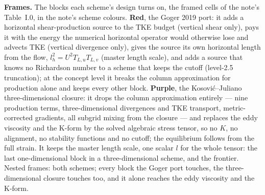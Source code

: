 \documentclass[10pt]{article}
\begin{document}
\begin{center}
\end{center}


\vspace{0.6ex}
{\footnotesize\textbf{Frames.} The blocks each scheme's design turns on, the framed cells of the note's Table~I.0,
in the note's scheme colours. \textcolor{cGXIX}{\textbf{Red}}, the Goger 2019 port: it adds a horizontal
shear-production source to the TKE budget (vertical shear only), pays it with the energy the numerical
horizontal operator would otherwise lose and advects TKE (vertical divergence only), gives the source its own
horizontal length from the flow, $l_h^2 = U^2 T_{L,u} T_{L,v}$ (master length scale), and adds a source that knows no
Richardson number to a scheme that keeps the cutoff (level-2.5 truncation); at the concept level it breaks the
column approximation for production alone and keeps every other block. \textcolor{cFULL}{\textbf{Purple}}, the
Kosovi\'c--Juliano three-dimensional closure: it drops the column approximation entirely --- nine production
terms, three-dimensional divergences and TKE transport, metric-corrected gradients, all subgrid mixing from the
closure --- and replaces the eddy viscosity and the K-form by the solved algebraic stress tensor, so no $K$, no
alignment, no stability functions and no cutoff; the equilibrium follows from the full strain. It keeps the master
length scale, one scalar $l$ for the whole tensor: the last one-dimensional block in a three-dimensional scheme, and
the frontier. Nested frames: both schemes; every block the Goger port touches, the three-dimensional closure touches
too, and it alone reaches the eddy viscosity and the K-form.\par}
\end{document}
